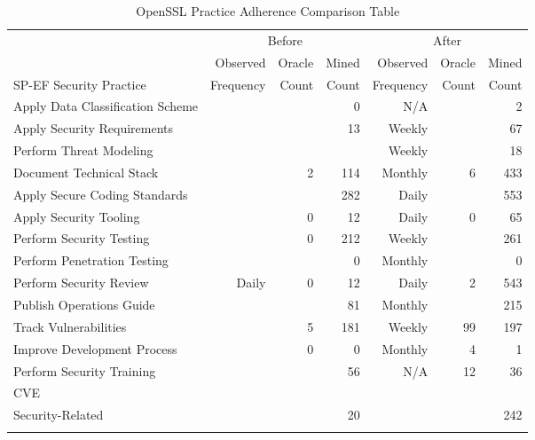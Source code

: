 \begin{table*}
	\begin{center}	
		\caption{OpenSSL Practice Adherence Comparison Table}
		\begin{tiny}
			
			\begin{tabular}{|l|rrr||rrr|}
				\topline
				\headcol & \multicolumn{3}{c}{Before} & \multicolumn{3}{c}{After}\\
				\headcol  & Observed & Oracle & Mined  & Observed & Oracle & Mined \\ 
				\headcol SP-EF Security Practice  & Frequency & Count & Count & Frequency & Count & Count\\
				\midline	
				Apply Data Classification Scheme & &  & 0 & N/A & & 2\\
				Apply Security Requirements  & &  & 13 & Weekly & & 67\\
				Perform Threat Modeling &  &  &  & Weekly & & 18\\
				Document Technical Stack  &  & 2 & 114 & Monthly & 6 & 433\\
				Apply Secure Coding Standards  &  &  & 282 & Daily & & 553\\
				Apply Security Tooling  &  & 0 & 12 & Daily & 0 & 65\\
				Perform Security Testing &  & 0  & 212 & Weekly & & 261\\
				Perform Penetration Testing  &  & & 0 & Monthly & & 0\\
				Perform Security Review  & Daily & 0 & 12 & Daily & 2 & 543\\
				Publish Operations Guide &  &  & 81 & Monthly & & 215\\
				Track Vulnerabilities & & 5 & 181 & Weekly & 99 & 197\\
				Improve Development Process & & 0 & 0 & Monthly & 4 & 1\\
				Perform Security Training &  &  & 56 & N/A & 12 & 36\\
				\midline
				CVE &  &  &  & &  & \\
				Security-Related &  &  & 20 & & & 242 \\
				
				\bottomline
			\end{tabular}
			
			\label{tab:pma_paComparisonTable}
		\end{tiny}
	\end{center}
\end{table*}





